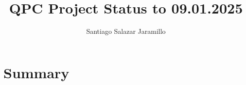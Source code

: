 \documentclass{article}
\title{QPC Project Status to 09.01.2025}
\author{Santiago Salazar Jaramillo}
\date{}
\begin{document}
\maketitle

\section{Summary}
\end{document}
